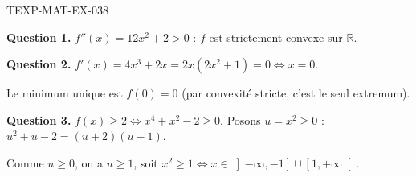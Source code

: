 \begin{corrige}{TEXP-MAT-EX-038}

\textbf{Question 1.} $f''(x) = 12x^2 + 2 > 0$ : $f$ est strictement convexe sur $\mathbb{R}$.


\textbf{Question 2.} $f'(x) = 4x^3 + 2x = 2x(2x^2+1) = 0 \iff x = 0$.

Le minimum unique est $f(0) = 0$ (par convexité stricte, c'est le seul extremum).

\textbf{Question 3.} $f(x) \geq 2 \iff x^4 + x^2 - 2 \geq 0$. Posons $u = x^2 \geq 0$ : $u^2 + u - 2 = (u+2)(u-1)$.

Comme $u \geq 0$, on a $u \geq 1$, soit $x^2 \geq 1 \iff x \in \left]-\infty, -1\right] \cup \left[1, +\infty\right[$.

\end{corrige}
